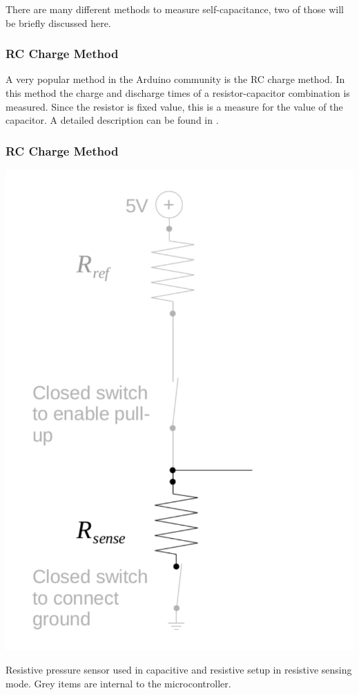 \documentclass{sigchi-ext}
\begin{document}
There are many different methods to measure
self-capacitance, two of those will be briefly discussed here.

\subsubsection{RC Charge Method}
A very popular method in the Arduino community is the RC charge
method. In this method the charge and discharge times of a resistor-capacitor
combination is measured. Since the resistor is fixed value, this is a measure
for the value of the capacitor. A detailed description can be found in
\cite{ST2009}.

\subsubsection{RC Charge Method}
\begin{marginfigure}
\begin{minipage}{\marginparwidth}
\centering
\includegraphics[width=0.9\columnwidth]{figures/cap_res_setup_res}
\caption{Resistive pressure sensor used in capacitive and resistive setup in
resistive sensing mode. Grey items are internal to the
microcontroller.}~\label{fig:cap_res_setup_res}
\end{minipage}
\end{marginfigure}
\end{document}
